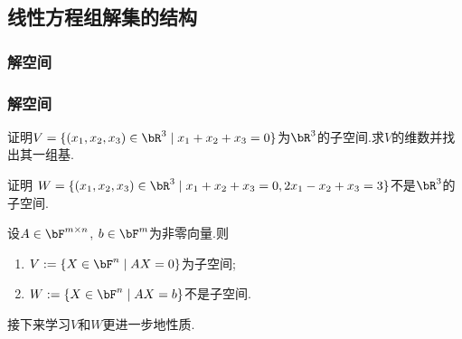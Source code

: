 \subsection{线性方程组解集的结构}

\subsubsection{解空间}
\begin{frame}\frametitle{解空间}
\begin{example}
证明$V=\{(x_1,x_2,x_3)\in\bR^3\mid x_1+x_2+x_3=0\}$为$\bR^3$的子空间.求$V$的维数并找出其一组基.
\end{example}
\pp
{}
\pp
\begin{example}
证明 $W=\{(x_1,x_2,x_3)\in\bR^3\mid x_1+x_2+x_3=0,2x_1-x_2+x_3=3\}$不是$\bR^3$的子空间.
\end{example}
\pp
设$A\in \bF^{m\times n}$, $b\in \bF^m$为非零向量.\pp 则 \begin{enumerate}
\item $V:=\{X\in \bF^n\mid AX=0\}$为子空间;
\item $W:=\{X\in \bF^n\mid AX=b\}$不是子空间.
\end{enumerate}
接下来学习$V$和$W$更进一步地性质.
\end{frame}

%







